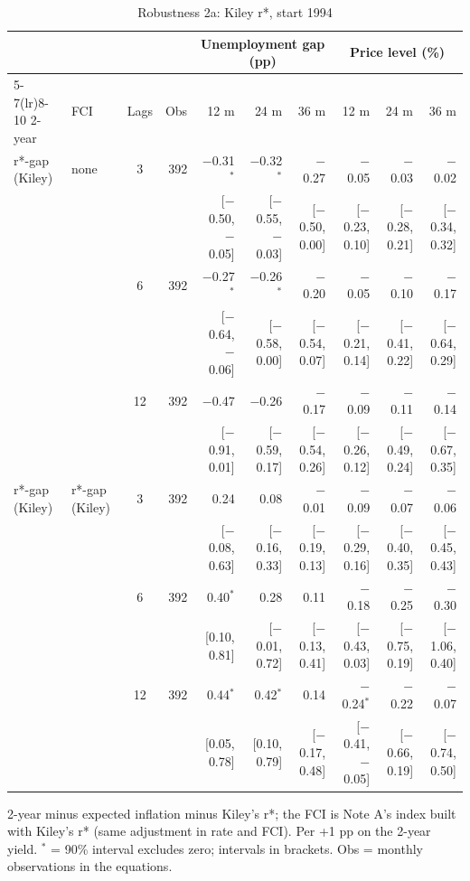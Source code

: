 \begin{table}[p]\centering\footnotesize\setlength{\tabcolsep}{2.2pt}
\caption{Robustness 2a: Kiley r*, start 1994}\label{tab:R2a}
\begin{tabular}{llcrrrrrrr}\toprule
 & & & & \multicolumn{3}{c}{Unemployment gap (pp)} & \multicolumn{3}{c}{Price level (\%)}\\ \cmidrule(lr){5-7}\cmidrule(lr){8-10}
2-year & FCI & Lags & Obs & 12 m & 24 m & 36 m & 12 m & 24 m & 36 m\\ \midrule
r*-gap (Kiley) & none & 3 & 392 & $-$0.31$^{*}$ & $-$0.32$^{*}$ & $-$0.27 & $-$0.05 & $-$0.03 & $-$0.02\\
 & & & & {\scriptsize [$-$0.50, $-$0.05]} & {\scriptsize [$-$0.55, $-$0.03]} & {\scriptsize [$-$0.50, 0.00]} & {\scriptsize [$-$0.23, 0.10]} & {\scriptsize [$-$0.28, 0.21]} & {\scriptsize [$-$0.34, 0.32]}\\
 &  & 6 & 392 & $-$0.27$^{*}$ & $-$0.26$^{*}$ & $-$0.20 & $-$0.05 & $-$0.10 & $-$0.17\\
 & & & & {\scriptsize [$-$0.64, $-$0.06]} & {\scriptsize [$-$0.58, 0.00]} & {\scriptsize [$-$0.54, 0.07]} & {\scriptsize [$-$0.21, 0.14]} & {\scriptsize [$-$0.41, 0.22]} & {\scriptsize [$-$0.64, 0.29]}\\
 &  & 12 & 392 & $-$0.47 & $-$0.26 & $-$0.17 & $-$0.09 & $-$0.11 & $-$0.14\\
 & & & & {\scriptsize [$-$0.91, 0.01]} & {\scriptsize [$-$0.59, 0.17]} & {\scriptsize [$-$0.54, 0.26]} & {\scriptsize [$-$0.26, 0.12]} & {\scriptsize [$-$0.49, 0.24]} & {\scriptsize [$-$0.67, 0.35]}\\
r*-gap (Kiley) & r*-gap (Kiley) & 3 & 392 & 0.24 & 0.08 & $-$0.01 & $-$0.09 & $-$0.07 & $-$0.06\\
 & & & & {\scriptsize [$-$0.08, 0.63]} & {\scriptsize [$-$0.16, 0.33]} & {\scriptsize [$-$0.19, 0.13]} & {\scriptsize [$-$0.29, 0.16]} & {\scriptsize [$-$0.40, 0.35]} & {\scriptsize [$-$0.45, 0.43]}\\
 &  & 6 & 392 & 0.40$^{*}$ & 0.28 & 0.11 & $-$0.18 & $-$0.25 & $-$0.30\\
 & & & & {\scriptsize [0.10, 0.81]} & {\scriptsize [$-$0.01, 0.72]} & {\scriptsize [$-$0.13, 0.41]} & {\scriptsize [$-$0.43, 0.03]} & {\scriptsize [$-$0.75, 0.19]} & {\scriptsize [$-$1.06, 0.40]}\\
 &  & 12 & 392 & 0.44$^{*}$ & 0.42$^{*}$ & 0.14 & $-$0.24$^{*}$ & $-$0.22 & $-$0.07\\
 & & & & {\scriptsize [0.05, 0.78]} & {\scriptsize [0.10, 0.79]} & {\scriptsize [$-$0.17, 0.48]} & {\scriptsize [$-$0.41, $-$0.05]} & {\scriptsize [$-$0.66, 0.19]} & {\scriptsize [$-$0.74, 0.50]}\\
\bottomrule\end{tabular}
\par\smallskip\parbox{0.96\linewidth}{\scriptsize 2-year minus expected inflation minus Kiley's r*; the FCI is Note A's index built with Kiley's r* (same adjustment in rate and FCI). Per +1 pp on the 2-year yield. $^{*}$ = 90\% interval excludes zero; intervals in brackets. Obs = monthly observations in the equations.}
\end{table}
